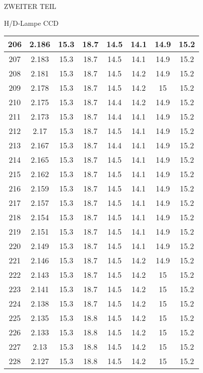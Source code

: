 \begin{appendix}
\begin{chapter}{ZWEITER TEIL}
\begin{section}{H/D-Lampe CCD}
\begin{scriptsize}
\begin{longtable}[htbp]{|c|c|c|c|c|c|c|c|}
            206 & 2.186 & 15.3 & 18.7 & 14.5 & 14.1 & 14.9 & 15.2 \\ \hline
            207 & 2.183 & 15.3 & 18.7 & 14.5 & 14.1 & 14.9 & 15.2 \\ \hline
            208 & 2.181 & 15.3 & 18.7 & 14.5 & 14.2 & 14.9 & 15.2 \\ \hline
            209 & 2.178 & 15.3 & 18.7 & 14.5 & 14.2 & 15 & 15.2 \\ \hline
            210 & 2.175 & 15.3 & 18.7 & 14.4 & 14.2 & 14.9 & 15.2 \\ \hline
            211 & 2.173 & 15.3 & 18.7 & 14.4 & 14.1 & 14.9 & 15.2 \\ \hline
            212 & 2.17 & 15.3 & 18.7 & 14.5 & 14.1 & 14.9 & 15.2 \\ \hline
            213 & 2.167 & 15.3 & 18.7 & 14.4 & 14.1 & 14.9 & 15.2 \\ \hline
            214 & 2.165 & 15.3 & 18.7 & 14.5 & 14.1 & 14.9 & 15.2 \\ \hline
            215 & 2.162 & 15.3 & 18.7 & 14.5 & 14.1 & 14.9 & 15.2 \\ \hline
            216 & 2.159 & 15.3 & 18.7 & 14.5 & 14.1 & 14.9 & 15.2 \\ \hline
            217 & 2.157 & 15.3 & 18.7 & 14.5 & 14.1 & 14.9 & 15.2 \\ \hline
            218 & 2.154 & 15.3 & 18.7 & 14.5 & 14.1 & 14.9 & 15.2 \\ \hline
            219 & 2.151 & 15.3 & 18.7 & 14.5 & 14.1 & 14.9 & 15.2 \\ \hline
            220 & 2.149 & 15.3 & 18.7 & 14.5 & 14.1 & 14.9 & 15.2 \\ \hline
            221 & 2.146 & 15.3 & 18.7 & 14.5 & 14.2 & 14.9 & 15.2 \\ \hline
            222 & 2.143 & 15.3 & 18.7 & 14.5 & 14.2 & 15 & 15.2 \\ \hline
            223 & 2.141 & 15.3 & 18.7 & 14.5 & 14.2 & 15 & 15.2 \\ \hline
            224 & 2.138 & 15.3 & 18.7 & 14.5 & 14.2 & 15 & 15.2 \\ \hline
            225 & 2.135 & 15.3 & 18.8 & 14.5 & 14.2 & 15 & 15.2 \\ \hline
            226 & 2.133 & 15.3 & 18.8 & 14.5 & 14.2 & 15 & 15.2 \\ \hline
            227 & 2.13 & 15.3 & 18.8 & 14.5 & 14.2 & 15 & 15.2 \\ \hline
            228 & 2.127 & 15.3 & 18.8 & 14.5 & 14.2 & 15 & 15.2 \\ \hline

\end{longtable}
\end{scriptsize}
\end{section}
\end{chapter}
\end{appendix}
